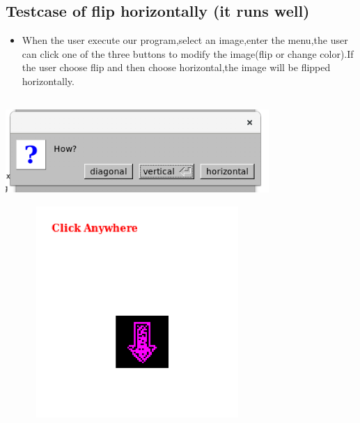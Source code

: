 \documentclass{article}
\begin{document}
\subsection*{Testcase of flip horizontally (it runs well)}
\begin{itemize}
	\item When the user execute our program,select an image,enter the menu,the user can click one of the three buttons to modify the image(flip or change color).If the user choose flip and then choose horizontal,the image will be flipped horizontally.
\end{itemize}
\includegraphics[width = 10cm, height = 4cm]{h1.png}
\includegraphics[width = 10cm, height = 8cm]{h2.png}
\end{document}

